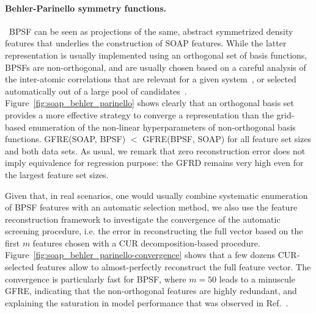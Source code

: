 \paragraph*{Behler-Parinello symmetry functions.}\,
BPSF can be seen as projections of the same, abstract symmetrized density features that underlies the construction of SOAP features.  While the latter representation is usually implemented using an orthogonal set of basis functions, BPSFs are non-orthogonal, and are usually chosen based on a careful analysis of the inter-atomic correlations that are relevant for a given system~\cite{behl11jcp,jose+12jcp,behl15ijqc}, or selected automatically out of a large pool of candidates~\cite{imba+18jcp}. 
Figure~\ref{fig:soap_behler_parinello} shows clearly that an orthogonal basis set provides a more effective strategy to converge a representation than the grid-based enumeration of the non-linear hyperparameters of non-orthogonal basis functions. GFRE(SOAP, BPSF) $<$ GFRE(BPSF, SOAP) for all feature set sizes and both data sets. As usual, we remark that zero reconstruction error does not imply equivalence for regression purpose: the GFRD remains very high even for the largest feature set sizes. 

Given that, in real scenarios, one would usually combine systematic enumeration of BPSF features with an automatic selection method\cite{imba+18jcp}, we also use the feature reconstruction framework to investigate the convergence of the automatic screening procedure, i.e. the error in reconstructing the full vector based on the first $m$ features chosen with a CUR decomposition-based procedure\cite{mahoney2009cur, imba+18jcp}.
Figure~\ref{fig:soap_behler_parinello-convergence} shows that a few dozens CUR-selected features allow to almost-perfectly reconstruct the full feature vector. The convergence is particularly fast for BPSF, where $m=50$ leads to a minuscule GFRE, indicating that the non-orthogonal features are highly redundant, and explaining the saturation in model performance that was observed in Ref.~.

